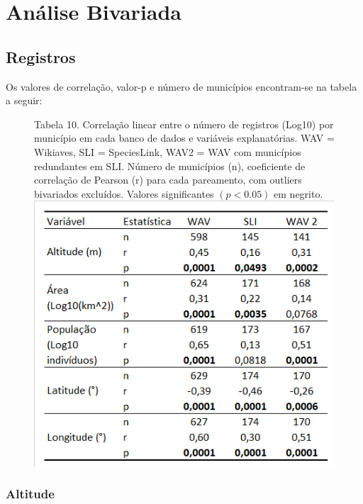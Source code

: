 \section{Análise Bivariada}

\hrulefill

\hrulefill



\subsection{Registros}

\begin{resposta}
Os valores de correlação, valor-p e número de municípios encontram-se na tabela a seguir:
\end{resposta}


\begin{figure}[h!]
\centering
{\scriptsize Tabela 10. Correlação linear entre o número de registros (Log10) por município em cada banco de dados e variáveis explanatórias. WAV = Wikiaves, SLI = SpeciesLink, WAV2 = WAV com municípios redundantes em SLI. Número de municípios (n), coeficiente de correlação de Pearson (r) para cada pareamento, com outliers bivariados excluídos. Valores significantes $(p < 0.05)$ em negrito. }
\\
\includegraphics{Imagens/T10.png}
\end{figure}

 

\subsubsection{Altitude}

